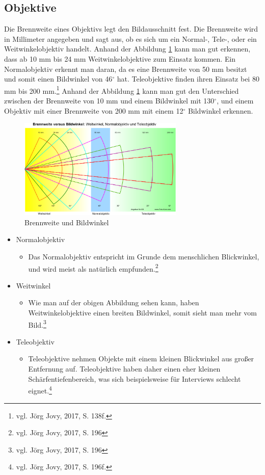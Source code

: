 \subsection{Objektive}
Die Brennweite eines Objektivs legt den Bildausschnitt fest. Die Brennweite wird in Millimeter angegeben und sagt aus, ob es sich um ein Normal-, Tele-, oder ein Weitwinkelobjektiv handelt.
Anhand der Abbildung \ref{fig:abb1} kann man gut erkennen, dass ab 10 mm bis 24 mm Weitwinkelobjektive zum Einsatz kommen. Ein Normalobjektiv erkennt man daran, da es eine Brennweite von 50 mm besitzt und somit einen Bildwinkel von 46$^\circ$ hat. Teleobjektive finden ihren Einsatz bei 80 mm bis 200 mm.\footnote{\label{}vgl. Jörg Jovy, 2017, S. 138f.} Anhand der Abbildung \ref{fig:abb1} kann man gut den Unterschied zwischen der Brennweite von 10 mm und einem Bildwinkel mit 130$^\circ$, und einem Objektiv mit einer Brennweite von 200 mm mit einem 12$^\circ$ Bildwinkel erkennen. 
\begin{figure}[H]
	\centering
	\includegraphics[width=0.7\textwidth]{abb1} 
	\caption[Brennweite und Bildwinkel]{Brennweite und Bildwinkel\footnotemark}\label{fig:abb1}
\end{figure}
\begin{itemize}
	\item Normalobjektiv
		\begin{itemize}
		\item Das Normalobjektiv entspricht im Grunde dem menschlichen Blickwinkel, und wird meist als natürlich empfunden.\footnote{\label{}vgl. Jörg Jovy, 2017, S. 196} 
		\end{itemize}
	\item Weitwinkel
		\begin{itemize}
		\item Wie man auf der obigen Abbildung sehen kann, haben Weitwinkelobjektive einen breiten Bildwinkel, somit sieht man mehr vom Bild.\footnote{\label{}vgl. Jörg Jovy, 2017, S. 196}
		\end{itemize}
	\item Teleobjektiv
		\begin{itemize}
		\item Teleobjektive nehmen Objekte mit einem kleinen Blickwinkel aus großer Entfernung auf. Teleobjektive haben daher einen eher kleinen Schärfentiefenbereich, was sich beispielsweise für Interviews schlecht eignet.\footnote{\label{}vgl. Jörg Jovy, 2017, S. 196f.}
\end{itemize}
\end{itemize}
